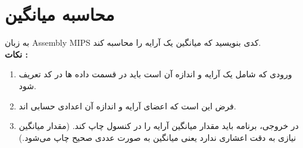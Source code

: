 \section{محاسبه میانگین}
{به زبان Assembly MIPS کدی بنویسید که میانگین یک آرایه را محاسبه کند.}\\
\bf {نکات :}
\normalfont
\begin{enumerate}
    \item {ورودی که شامل یک آرایه و اندازه آن است باید در قسمت داده ها در کد تعریف شود.}\\
    \item {فرض این است که اعضای آرایه و اندازه آن اعدادی حسابی اند.}
    \item {در خروجی، برنامه باید مقدار میانگین آرایه را در کنسول چاپ کند. (مقدار میانگین نیازی به دقت اعشاری ندارد یعنی میانگین به صورت عددی صحیح چاپ می‌شود.)}
\end{enumerate}
